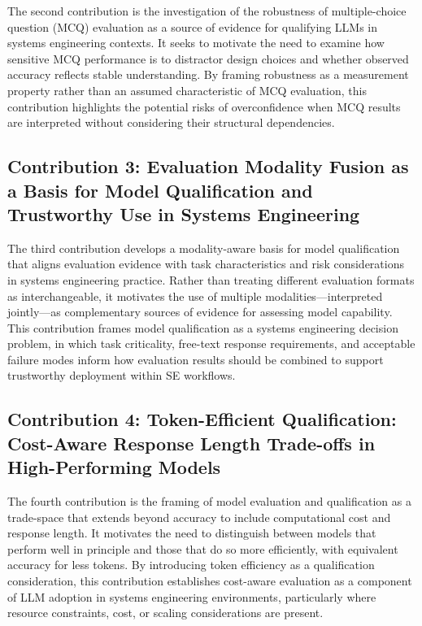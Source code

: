 The second contribution is the investigation of the robustness of multiple-choice question (MCQ) evaluation as a source of evidence for qualifying LLMs in systems engineering contexts. It seeks to motivate the need to examine how sensitive MCQ performance is to distractor design choices and whether observed accuracy reflects stable understanding. By framing robustness as a measurement property rather than an assumed characteristic of MCQ evaluation, this contribution highlights the potential risks of overconfidence when MCQ results are interpreted without considering their structural dependencies. 


\subsection{Contribution 3: Evaluation Modality Fusion as a Basis for Model Qualification and Trustworthy Use in Systems Engineering}\label{subsec:Contribution_three}

The third contribution develops a modality-aware basis for model qualification that aligns evaluation evidence with task characteristics and risk considerations in systems engineering practice. Rather than treating different evaluation formats as interchangeable, it motivates the use of multiple modalities—interpreted jointly—as complementary sources of evidence for assessing model capability.  This contribution frames model qualification as a systems engineering decision problem, in which task criticality, free-text response requirements, and acceptable failure modes inform how evaluation results should be combined to support trustworthy deployment within SE workflows. 


\subsection{Contribution 4: Token-Efficient Qualification: Cost-Aware Response Length Trade-offs in High-Performing Models}\label{subsec:Contribution_four}

The fourth contribution is the framing of model evaluation and qualification as a trade-space that extends beyond accuracy to include computational cost and response length. It motivates the need to distinguish between models that perform well in principle and those that do so more efficiently, with equivalent accuracy for less tokens. By introducing token efficiency as a qualification consideration, this contribution establishes cost-aware evaluation as a component of LLM adoption in systems engineering environments, particularly where resource constraints, cost, or scaling considerations are present. 


